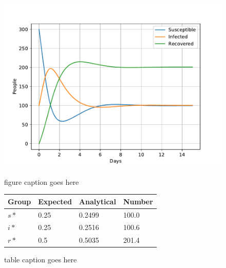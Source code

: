 \documentclass[a4paper]{article}
\begin{document}
\begin{figure}
	\centering
	\begin{minipage}{0.49\textwidth}
		\centering
		\includegraphics[scale=0.6]{../plots/opp_a_A.pdf}
		\caption{figure caption goes here}\label{fig:opp_a_A}
	\end{minipage}
	\begin{minipage}{0.49\textwidth}
		\centering
		\captionsetup{type=table} %
		\begin{tabular}{|l|l|l|l|}
			\hline
			Group & Expected & Analytical   & Number  \\ \hline
			$s*$ & 0.25 & 0.2499 & 100.0 \\ \hline
			$i*$ & 0.25 & 0.2516 & 100.6 \\ \hline
			$r*$ & 0.5  & 0.5035 & 201.4 \\ \hline
		\end{tabular}
		\caption{table caption goes  here}\label{tab:opp_a_A}
	\end{minipage}
\end{figure}
\end{document}
